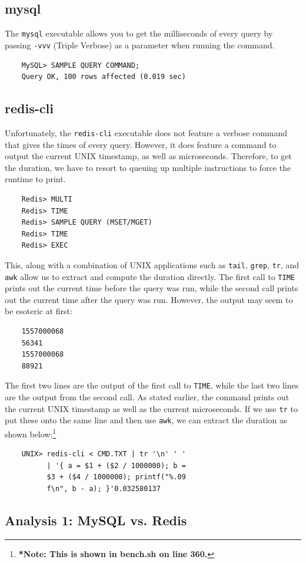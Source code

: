 \documentclass[letterpaper, 10 pt, conference]{ieeeconf}
\begin{document}
\subsection{mysql}
The \texttt{mysql} executable allows you to get the milliseconds of every query by passing \texttt{-vvv} (Triple Verbose) as a parameter when running the command.
\begin{verbatim}
    MySQL> SAMPLE QUERY COMMAND;
    Query OK, 100 rows affected (0.019 sec)
\end{verbatim}
\subsection{redis-cli}
Unfortunately, the \texttt{redis-cli} executable does not feature a verbose command that gives the times of every query. However, it does feature a command to output the current UNIX timestamp, as well as microseconds. Therefore, to get the duration, we have to resort to queuing up multiple instructions to force the runtime to print.
\begin{verbatim}
    Redis> MULTI
    Redis> TIME
    Redis> SAMPLE QUERY (MSET/MGET)
    Redis> TIME
    Redis> EXEC
\end{verbatim}
This, along with a combination of UNIX applications such as \texttt{tail}, \texttt{grep}, \texttt{tr}, and \texttt{awk} allow us to extract and compute the duration directly. The first call to \texttt{TIME} prints out the current time before the query was run, while the second call prints out the current time after the query was run. However, the output may seem to be esoteric at first:
\begin{verbatim}
    1557000068
    56341
    1557000068
    88921
\end{verbatim}
The first two lines are the output of the first call to \texttt{TIME}, while the last two lines are the output from the second call. As stated earlier, the command prints out the current UNIX timestamp as well as the current microseconds. If we use \texttt{tr} to put these onto the same line and then use \texttt{awk}, we can extract the duration as shown below:\footnote[*]{\textbf{*Note: This is shown in bench.sh on line 360.}}
\begin{verbatim}
    UNIX> redis-cli < CMD.TXT | tr '\n' ' '
          | '{ a = $1 + ($2 / 1000000); b = 
          $3 + ($4 / 1000000); printf("%.09
          f\n", b - a); }'0.032580137
\end{verbatim}


\subsection{Analysis 1: MySQL vs. Redis}
\end{document}
